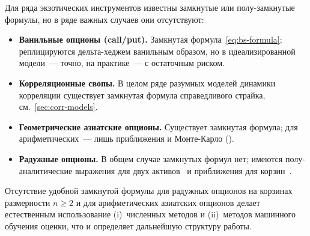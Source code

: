 Для ряда экзотических инструментов известны замкнутые или
полу-замкнутые формулы, но в ряде важных случаев они отсутствуют:

\begin{itemize}
  \item \textbf{Ванильные опционы (call/put).} Замкнутая
        формула~\eqref{eq:bs-formula}; реплицируются дельта-хеджем
        ванильным образом, но в идеализированной модели~--- точно, на
        практике~--- с остаточным риском.
  \item \textbf{Корреляционные свопы.} В целом ряде разумных моделей
        динамики корреляции существует замкнутая формула справедливого
        страйка, см.~\cref{sec:corr-models}.
  \item \textbf{Геометрические азиатские опционы.} Существует замкнутая
        формула; для арифметических~--- лишь приближения и Монте-Карло
        (\cite{kemna1990pricing, vorst1992prices}).
  \item \textbf{Радужные опционы.} В общем случае замкнутых формул нет;
        имеются полу-аналитические выражения для двух
        активов~\cite{stulz1982options, johnson1987options} и
        приближения для корзин~\cite{vorst1992prices, wilmott2006pwif}.
\end{itemize}

Отсутствие удобной замкнутой формулы для радужных опционов на корзинах
размерности $n\ge 2$ и для арифметических азиатских опционов делает
естественным использование (i)~численных методов и (ii)~методов машинного обучения
 оценки, что и определяет дальнейшую структуру работы.

